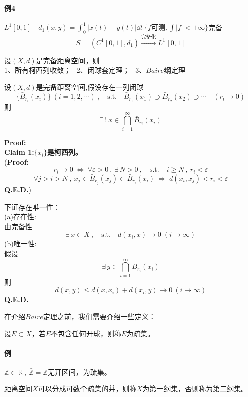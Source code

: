 \paragraph*{例4} \quad $L^1[0,1] \quad d_1(x,y)=\int_0^1|x(t)-y(t)|\dd t \ \{f\text{可测},\int|f|<+\infty\}$完备
\[S=\left(C^1[0,1],d_1\right) \xrightarrow{\text{完备化}} L^1[0,1]\]

\begin{theorem}
    设$(X,d)$是完备距离空间，则\\
    1、所有柯西列收敛； \ 2、闭球套定理； \ 3、$Baire$纲定理
\end{theorem}
\begin{theorem}[闭球套定理]
设$(X,d)$是完备距离空间,假设存在一列闭球
\[\{\bar{B}_{r_i}(x_i)\} \ (i=1,2,\cdots) \ , \quad \text{s.t.} \quad \bar{B}_{r_1}(x_1) \supset \bar{B}_{r_2}(x_2) \supset \cdots \quad (r_i \to 0)\]
则
\[\exists \, ! \ x \in \bigcap_{i=1}^{\infty}\bar{B}_{r_i}(x_i)\]
\end{theorem}

\textbf{Proof:}\\
\textbf{Claim 1:$\{x_i\}$是柯西列。}\\
(\textbf{Proof:}
\[r_i \to 0 \ \Leftrightarrow \ \forall \varepsilon>0 \ , \ \exists \, N>0 \ , \quad \text{s.t.} \quad i \geq N \ , \ r_i<\varepsilon\]
\[\forall j>i>N \ , \ x_j \in \bar{B}_{r_j}(x_j) \subset \bar{B}_{r_i}(x_i) \ \Rightarrow \ d(x_i,x_j)<r_i<\varepsilon\]
\textbf{Q.E.D.})

下证存在唯一性：\\
(a)存在性:\\
由完备性
\[\exists \, x \in X \ , \quad \text{s.t.} \quad d(x_i,x) \rightarrow 0 \ (i \rightarrow \infty)\]
(b)唯一性:\\
假设
\[\exists \, y \in \bigcap_{i=1}^{\infty}\bar{B}_{r_i}(x_i)\]
则
\[d(x,y) \leq d(x,x_i)+d(x_i,y) \rightarrow 0 \ (i \rightarrow \infty)\]
\textbf{Q.E.D.} 

在介绍$Baire$定理之前，我们需要介绍一些定义：
\begin{definition}[疏集]
    设$E \subset X$，若$\bar{E}$不包含任何开球，则称$E$为疏集。
\end{definition}
\paragraph*{例} \quad $\mathbb{Z} \subset \mathbb{R} \ , \ \bar{\mathbb{Z}}=\mathbb{Z}$无开区间，为疏集。
\begin{definition}
    距离空间$X$可以分成可数个疏集的并，则称$X$为第一纲集，否则称为第二纲集。
\end{definition}
